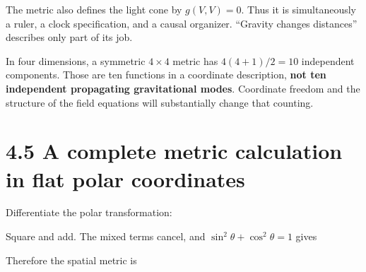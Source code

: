 \documentclass[
  11pt,
  letterpaper,
  oneside,
  openany]{scrbook}
\begin{document}
The metric also defines the light cone by \(g(V,V)=0\). Thus it is
simultaneously a ruler, a clock specification, and a causal organizer.
``Gravity changes distances'' describes only part of its job.

In four dimensions, a symmetric \(4\times4\) metric has \(4(4+1)/2=10\)
independent components. Those are ten functions in a coordinate
description, \textbf{not ten independent propagating gravitational
modes}. Coordinate freedom and the structure of the field equations will
substantially change that counting.

\hypertarget{a-complete-metric-calculation-in-flat-polar-coordinates}{%
\section{4.5 A complete metric calculation in flat polar
coordinates}\label{a-complete-metric-calculation-in-flat-polar-coordinates}}

Differentiate the polar transformation:

\begin{center}
\begingroup
{}
\ifdim\wd\grmathbox>\linewidth
\resizebox{\linewidth}{!}{\usebox{\grmathbox}}
\else\usebox{\grmathbox}\fi
\endgroup
\end{center}

Square and add. The mixed terms cancel, and
\(\sin^2\theta+\cos^2\theta=1\) gives

\begin{center}
\begingroup
{}
\ifdim\wd\grmathbox>\linewidth
\resizebox{\linewidth}{!}{\usebox{\grmathbox}}
\else\usebox{\grmathbox}\fi
\endgroup
\end{center}

Therefore the spatial metric is

\begin{center}
\begingroup
{}
\ifdim\wd\grmathbox>\linewidth
\resizebox{\linewidth}{!}{\usebox{\grmathbox}}
\else\usebox{\grmathbox}\fi
\endgroup
\end{center}
\end{document}
